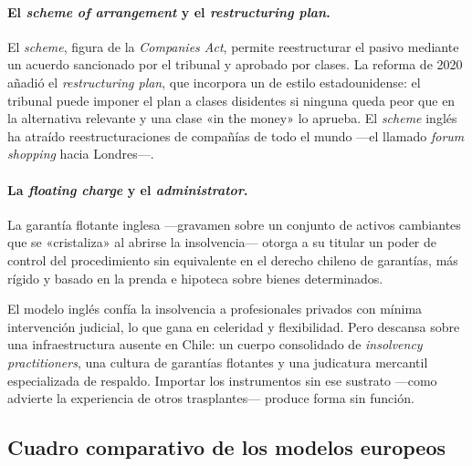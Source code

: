 \paragraph{El \emph{scheme of arrangement} y el \emph{restructuring plan}.} El \emph{scheme}, figura
de la \emph{Companies Act}, permite reestructurar el pasivo mediante un acuerdo sancionado por el
tribunal y aprobado por clases. La reforma de 2020 añadió el \emph{restructuring plan}, que incorpora
un  de estilo estadounidense: el tribunal puede imponer el
plan a clases disidentes si ninguna queda peor que en la alternativa relevante y una clase «in the
money» lo aprueba. El \emph{scheme} inglés ha atraído reestructuraciones de compañías de todo el
mundo ---el llamado \emph{forum shopping} hacia Londres---.

\paragraph{La \emph{floating charge} y el \emph{administrator}.} La garantía flotante inglesa
---gravamen sobre un conjunto de activos cambiantes que se «cristaliza» al abrirse la insolvencia---
otorga a su titular un poder de control del procedimiento sin equivalente en el derecho chileno de
garantías, más rígido y basado en la prenda e hipoteca sobre bienes determinados.

\begin{alerta}
El modelo inglés confía la insolvencia a profesionales privados con mínima intervención judicial, lo
que gana en celeridad y flexibilidad. Pero descansa sobre una infraestructura ausente en Chile: un
cuerpo consolidado de \emph{insolvency practitioners}, una cultura de garantías flotantes y una
judicatura mercantil especializada de respaldo. Importar los instrumentos sin ese sustrato
---como advierte la experiencia de otros trasplantes--- produce forma sin función.
\end{alerta}

\bloquePractico

\subsection{Cuadro comparativo de los modelos europeos}

